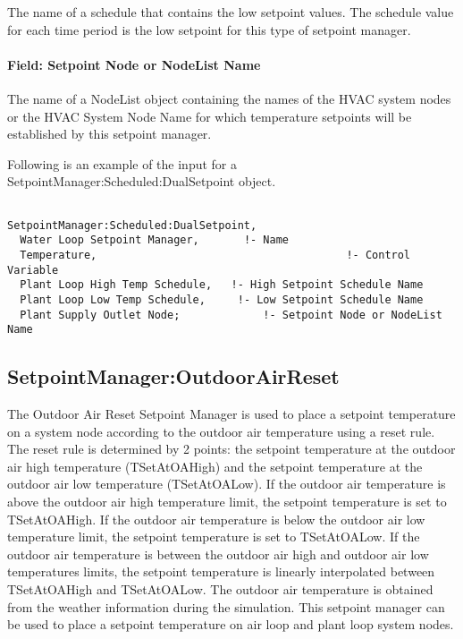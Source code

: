 The name of a schedule that contains the low setpoint values. The schedule value for each time period is the low setpoint for this type of setpoint manager.

\paragraph{Field: Setpoint Node or NodeList Name}\label{field-setpoint-node-or-nodelist-name-1}

The name of a NodeList object containing the names of the HVAC system nodes or the HVAC System Node Name for which temperature setpoints will be established by this setpoint manager.

Following is an example of the input for a SetpointManager:Scheduled:DualSetpoint object.

\begin{lstlisting}

SetpointManager:Scheduled:DualSetpoint,
  Water Loop Setpoint Manager,       !- Name
  Temperature,                                       !- Control Variable
  Plant Loop High Temp Schedule,   !- High Setpoint Schedule Name
  Plant Loop Low Temp Schedule,     !- Low Setpoint Schedule Name
  Plant Supply Outlet Node;             !- Setpoint Node or NodeList Name
\end{lstlisting}

\subsection{SetpointManager:OutdoorAirReset}\label{setpointmanageroutdoorairreset}

The Outdoor Air Reset Setpoint Manager is used to place a setpoint temperature on a system node according to the outdoor air temperature using a reset rule. The reset rule is determined by 2 points: the setpoint temperature at the outdoor air high temperature (TSetAtOAHigh) and the setpoint temperature at the outdoor air low temperature (TSetAtOALow). If the outdoor air temperature is above the outdoor air high temperature limit, the setpoint temperature is set to TSetAtOAHigh. If the outdoor air temperature is below the outdoor air low temperature limit, the setpoint temperature is set to TSetAtOALow. If the outdoor air temperature is between the outdoor air high and outdoor air low temperatures limits, the setpoint temperature is linearly interpolated between TSetAtOAHigh and TSetAtOALow. The outdoor air temperature is obtained from the weather information during the simulation. This setpoint manager can be used to place a setpoint temperature on air loop and plant loop system nodes.

